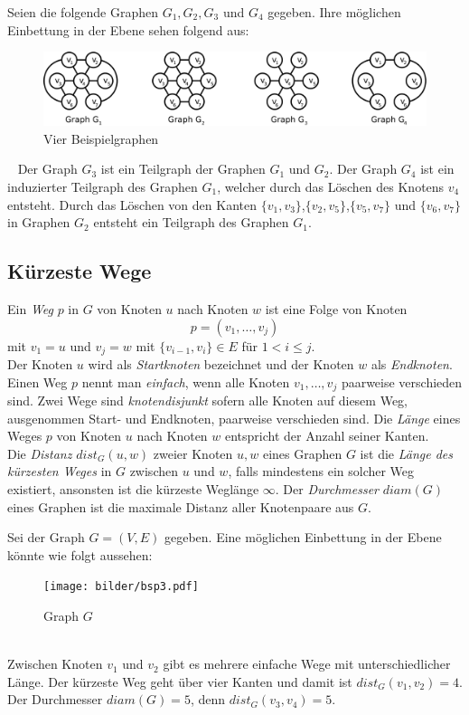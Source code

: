 \begin{bsp}
Seien die folgende Graphen $G_1,G_2,G_3$ und $G_4$ gegeben. Ihre möglichen Einbettung in der Ebene sehen folgend aus:
\begin{figure}[h!]
		\centering 		 
   \includegraphics[width=430pt]{bilder/bsp2.pdf}
	\caption{Vier Beispielgraphen}
  	 \end{figure}
  	 ~\newline  	 
Der Graph $G_3$ ist ein Teilgraph der Graphen $G_1$ und $G_2$. Der Graph $G_4$ ist ein induzierter Teilgraph des Graphen $G_1$, welcher durch das Löschen des Knotens $v_4$ entsteht. Durch das Löschen von den Kanten $\{v_1,v_3\}$,$\{v_2,v_5\}$,$\{v_5,v_7\}$ und $\{v_6,v_7\}$ in Graphen $G_2$ entsteht ein Teilgraph des Graphen $G_1$.
\end{bsp}
\subsection{Kürzeste Wege}
Ein \emph{Weg} $p$ in $G$ von Knoten $u$ nach Knoten $w$ ist eine Folge von Knoten $$p=(v_1,\ldots,v_j)$$ mit $v_1=u$ und $v_j=w$ mit $\{v_{i-1},v_i\}\in E$ für $1 <i \leq j$.\\Der Knoten $u$ wird als \emph{Startknoten} bezeichnet und der Knoten $w$ als \emph{Endknoten}.%
\\Einen Weg $p$ nennt man \emph{einfach}, wenn alle Knoten $v_1,\ldots,v_j$ paarweise verschieden sind. Zwei Wege sind \emph{knotendisjunkt} sofern alle Knoten auf diesem Weg, ausgenommen Start- und Endknoten, paarweise verschieden sind. Die \emph{Länge} eines Weges $p$ von Knoten $u$ nach Knoten $w$ entspricht der Anzahl seiner Kanten.\\
Die \emph{Distanz} $dist_G(u,w)$ zweier Knoten $u,w$ eines Graphen $G$ ist die \emph{Länge des kürzesten Weges} in $G$ zwischen $u$ und $w$, falls mindestens ein solcher Weg existiert, ansonsten ist die kürzeste Weglänge $\infty$. Der \emph{Durchmesser} $diam(G)$ eines Graphen ist die maximale Distanz aller Knotenpaare aus $G$.
\begin{bsp}
Sei der Graph $G=(V,E)$ gegeben. Eine möglichen Einbettung in der Ebene könnte wie folgt aussehen:\\
\begin{figure}[h!]
		\centering 		 
   \texttt{[image: bilder/bsp3.pdf]}
	\caption{Graph $G$}
  	 \end{figure}
  	 \\
Zwischen Knoten $v_1$ und $v_2$ gibt es mehrere einfache Wege mit unterschiedlicher Länge. Der kürzeste Weg geht über vier Kanten und damit ist $dist_G(v_1, v_2)=4$. Der Durchmesser $diam(G)=5$, denn $dist_G(v_3, v_4)=5$.
\end{bsp}
